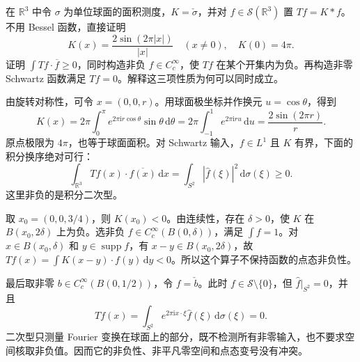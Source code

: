\begin{exercise}\label{b2:ex:23-new-4}
在 \(\mathbb R^3\) 中令 \(\sigma\) 为单位球面的面积测度，\(K=\check\sigma\)，并对 \(f\in\mathcal S(\mathbb R^3)\) 置 \(Tf=K*f\)。不用 Bessel 函数，直接证明
\[
 K(x)=\frac{2\sin(2\pi|x|)}{|x|}\quad(x\ne0),
 \quad K(0)=4\pi.
\]
证明 \(\int Tf\cdot\overline f\geq0\)，同时构造非负 \(f\in C_c^\infty\)，使 \(Tf\) 在某个开集内为负。再构造非零 Schwartz 函数满足 \(Tf=0\)。解释这三项性质为何可以同时成立。
\end{exercise}
\begin{solution}
由旋转对称性，可令 \(x=(0,0,r)\)。用球面极坐标并作换元 \(u=\cos\theta\)，得到
\[
 K(x)=2\pi\int_0^\pi e^{2\pi\mathrm i r\cos\theta}\sin\theta\,\mathrm d\theta
 =2\pi\int_{-1}^1e^{2\pi\mathrm i ru}\,\mathrm du
 =\frac{2\sin(2\pi r)}r.
\]
原点极限为 \(4\pi\)，也等于球面面积。对 Schwartz 输入，\(f\in L^1\) 且 \(K\) 有界，下面的积分换序绝对可行：
\[
 \int_{\mathbb R^3}Tf(x)\cdot\overline{f(x)}\,\mathrm dx
 =\int_{S^2}|\widehat f(\xi)|^2\,\mathrm d\sigma(\xi)\geq0.
\]
这里非负的是积分二次型。

取 \(x_0=(0,0,3/4)\)，则 \(K(x_0)<0\)。由连续性，存在 \(\delta>0\)，使 \(K\) 在 \(B(x_0,2\delta)\) 上为负。选非负 \(f\in C_c^\infty(B(0,\delta))\)，满足 \(\int f=1\)。对 \(x\in B(x_0,\delta)\) 和 \(y\in\operatorname{supp}f\)，有 \(x-y\in B(x_0,2\delta)\)，故
\(Tf(x)=\int K(x-y)\cdot f(y)\,\mathrm dy<0\)。所以这个算子不保持函数的点态非负性。

最后取非零 \(b\in C_c^\infty(B(0,1/2))\)，令 \(f=\check b\)。此时 \(f\in\mathcal S\setminus\{0\}\)，但 \(\widehat f|_{S^2}=0\)，并且
\[
 Tf(x)=\int_{S^2}e^{2\pi\mathrm i x\cdot\xi}\widehat f(\xi)\,\mathrm d\sigma(\xi)=0.
\]
二次型只测量 Fourier 变换在球面上的部分，既不检测所有非零输入，也不要求空间核取非负值。因而它的非负性、非平凡零空间和点态变号没有冲突。
\end{solution}

